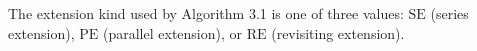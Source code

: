 \begin{definition}
The extension kind used by Algorithm 3.1 is one of three values:
\(\mathrm{SE}\) (series extension), \(\mathrm{PE}\) (parallel extension), or
\(\mathrm{RE}\) (revisiting extension).
\end{definition}

